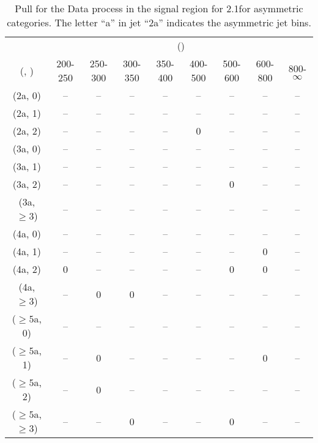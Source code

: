 \begin{table}[h!]
\tiny
\centering
\caption{Pull for the Data process in the signal region for 2.1\ifb for asymmetric categories. The letter ``a'' in jet \eg ``2a''  indicates the asymmetric jet bins.\label{tab:pullsep_sig_data_asym}}
\begin{tabular}
{ccccccccc}
	\hline\hline
	& \multicolumn{8}{c}{\scalht (\gev)} \\ 
	 (\njet,  \nb) & 200-250 & 250-300 & 300-350 & 350-400 & 400-500 & 500-600 & 600-800 & 800-$\infty$ \\ [0.8ex] 
\hline
	(2a, 0) & -- & -- & -- & -- & -- & -- & -- & -- \\[0.5ex] 
	(2a, 1) & -- & -- & -- & -- & -- & -- & -- & -- \\[0.5ex] 
	(2a, 2) & -- & -- & -- & -- & 0 & -- & -- & -- \\[0.5ex] 
	(3a, 0) & -- & -- & -- & -- & -- & -- & -- & -- \\[0.5ex] 
	(3a, 1) & -- & -- & -- & -- & -- & -- & -- & -- \\[0.5ex] 
	(3a, 2) & -- & -- & -- & -- & -- & 0 & -- & -- \\[0.5ex] 
	(3a, $\ge3$) & -- & -- & -- & -- & -- & -- & -- & -- \\[0.5ex] 
	(4a, 0) & -- & -- & -- & -- & -- & -- & -- & -- \\[0.5ex] 
	(4a, 1) & -- & -- & -- & -- & -- & -- & 0 & -- \\[0.5ex] 
	(4a, 2) & 0 & -- & -- & -- & -- & 0 & 0 & -- \\[0.5ex] 
	(4a, $\ge3$) & -- & 0 & 0 & -- & -- & -- & -- & -- \\[0.5ex] 
	($\ge5$a, 0) & -- & -- & -- & -- & -- & -- & -- & -- \\[0.5ex] 
	($\ge5$a, 1) & -- & 0 & -- & -- & -- & -- & 0 & -- \\[0.5ex] 
	($\ge5$a, 2) & -- & 0 & -- & -- & -- & -- & -- & -- \\[0.5ex] 
	($\ge5$a, $\ge3$) & -- & -- & 0 & -- & -- & 0 & -- & -- \\[0.5ex] 
	\hline
	\hline
\end{tabular}
\end{table}
